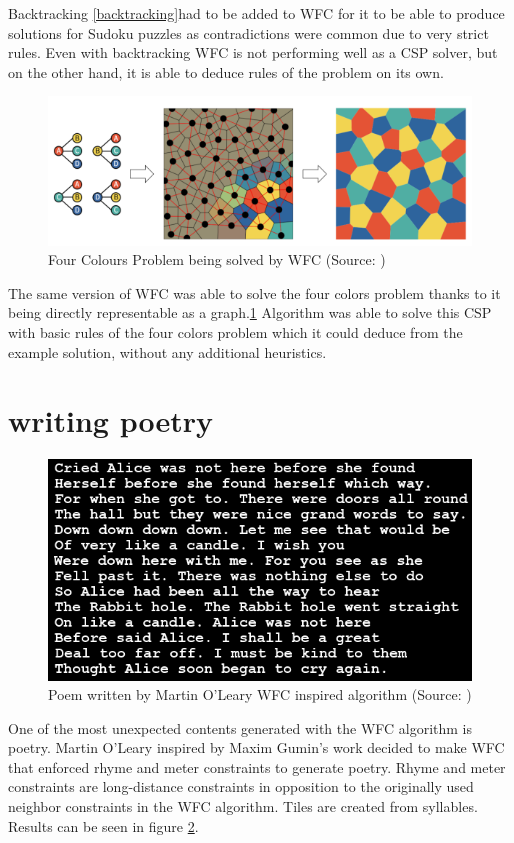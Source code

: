\documentclass[shortabstract, english, inz]{iithesis}
\begin{document}
Backtracking \ref{backtracking}had to be added to WFC for it to be able to produce solutions for Sudoku puzzles as contradictions were common due to very strict rules. Even with backtracking WFC is not performing well as a CSP solver, but on the other hand, it is able to deduce rules of the problem on its own.\cite{GraphBased}
\begin{figure}[H]
\centering
\includegraphics[width=1\textwidth, angle=0]{images/fourcolours.png}
\caption{Four Colours Problem being solved by WFC (Source: \cite{GraphBased})}
\label{fig:fourcolours}
\end{figure}
The same version of WFC was able to solve the four colors problem thanks to it being directly representable as a graph.\ref{fig:fourcolours} Algorithm was able to solve this CSP with basic rules of the four colors problem which it could deduce from the example solution, without any additional heuristics.\cite{GraphBased}


\section{writing poetry}
\begin{figure}[H]
\centering
\includegraphics[width=1\textwidth, angle=0]{images/poem.png}
\caption{Poem written by Martin O’Leary WFC inspired algorithm (Source: \cite{wfcpoem})}
\label{fig:poem}
\end{figure}
One of the most unexpected contents generated with the WFC algorithm is poetry. Martin O’Leary inspired by Maxim Gumin's work decided to make WFC that enforced rhyme and meter constraints to generate poetry. Rhyme and meter constraints are long-distance constraints in opposition to the originally used neighbor constraints in the WFC algorithm. Tiles are created from syllables. Results can be seen in figure \ref{fig:poem}.\cite{Smith, wfcpoem}
\end{document}
